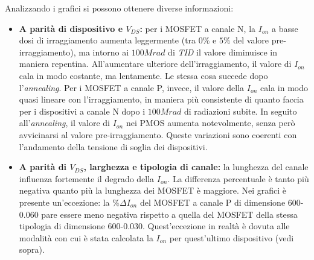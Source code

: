 Analizzando i grafici si possono ottenere diverse informazioni:
\begin{itemize}
    \item \textbf{A parità di dispositivo e $V_{DS}$:} per i MOSFET a canale N, la $I_{on}$ a basse dosi di irraggiamento aumenta leggermente (tra $0\%$ e $5\%$ del valore pre-irraggiamento), ma intorno ai $100 Mrad$ di \emph{TID} il valore diminuisce in maniera repentina. All'aumentare ulteriore dell'irraggiamento, il valore di $I_{on}$ cala in modo costante, ma lentamente. Le stessa cosa succede dopo l'\emph{annealing}. Per i MOSFET a canale P, invece, il valore della $I_{on}$ cala in modo quasi lineare con l'irraggiamento, in maniera più consistente di quanto faccia per i dispositivi a canale N dopo i $100 Mrad$ di radiazioni subite. In seguito all'\emph{annealing}, il valore di $I_{on}$ nei PMOS aumenta notevolmente, senza però avvicinarsi al valore pre-irraggiamento. Queste variazioni sono coerenti con l'andamento della tensione di soglia dei dispositivi.
	
	
    \item \textbf{A parità di $V_{DS}$, larghezza e tipologia di canale:} la lunghezza del canale influenza fortemente il degrado della $I_{on}$. La differenza percentuale è tanto più negativa quanto più la lunghezza dei MOSFET è maggiore. Nei grafici è presente un'eccezione: la $\% \Delta I_{on}$ del MOSFET a canale P di dimensione 600-0.060 pare essere meno negativa rispetto a quella del MOSFET della stessa tipologia di dimensione 600-0.030. Quest'eccezione in realtà è dovuta alle modalità con cui è stata calcolata la $I_{on}$ per quest'ultimo dispositivo (vedi sopra).

\end{itemize}
\FloatBarrier


